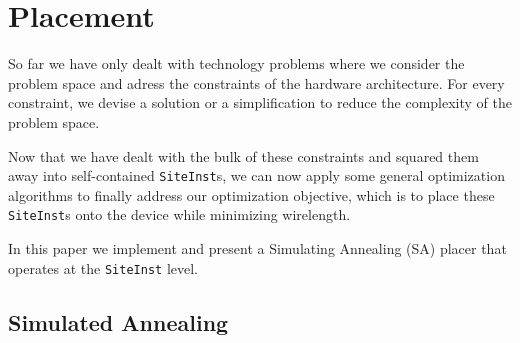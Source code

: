 
\section{Placement}
\label{sec:placement}
So far we have only dealt with technology problems where we consider the problem space and adress the constraints of the hardware architecture. 
For every constraint, we devise a solution or a simplification to reduce the complexity of the problem space. 

Now that we have dealt with the bulk of these constraints and squared them away into self-contained \texttt{SiteInst}s, we can now apply some general optimization algorithms to finally address our optimization objective, which is to place these \texttt{SiteInst}s onto the device while minimizing wirelength. 

In this paper we implement and present a Simulating Annealing (SA) placer that operates at the \texttt{SiteInst} level. 



\subsection{Simulated Annealing}
\label{subsec:simulated_annealing}

